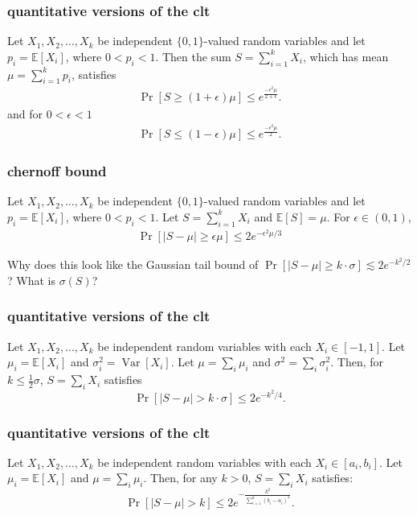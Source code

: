 \documentclass[compress]{beamer}
\newcommand{\E}{\mathbb{E}}
\DeclareMathOperator{\Var}{Var}
\begin{document}
\begin{frame}
	\frametitle{quantitative versions of the clt}
	\begin{theorem}
		Let $X_1,X_2,\ldots,X_k$ be independent $\{0,1\}$-valued random variables and let
		$p_i = \E[X_i]$, where $0<p_i<1$.
		Then the sum $S = \sum_{i=1}^{k} X_i$, which has mean
		$\mu = \sum_{i=1}^{k} p_i$, satisfies
		\begin{align*}
			\Pr[S \geq (1+\epsilon)\mu] \leq e^{\frac{-\epsilon^2\mu}{2+ \epsilon}}.
		\end{align*}
		and for $0<\epsilon <1$
		\begin{align*}
			\Pr[S \leq (1-\epsilon)\mu] \leq e^{\frac{-\epsilon^2\mu}{2}}.
		\end{align*}
	\end{theorem} 
\end{frame}

\begin{frame}[t]
	\frametitle{chernoff bound}
	\begin{theorem}
		Let $X_1,X_2,\ldots,X_k$ be independent $\{0,1\}$-valued random variables and let
		$p_i = \E[X_i]$, where $0<p_i<1$.
		Let $S = \sum_{i=1}^{k} X_i$ and $\E[S] = \mu$. For $\epsilon \in (0,1)$,
		\begin{align*}
				\Pr[|S - \mu| \geq \epsilon \mu] \leq 2e^{-\epsilon^2 \mu/3}
		\end{align*}
	\end{theorem} 
Why does this look like the Gaussian tail bound of 	$\Pr[|S - \mu| \geq k\cdot\sigma] \lesssim 2e^{-k^2/2}$? What is $\sigma(S)$?
\end{frame}



\begin{frame}[t]
	\frametitle{quantitative versions of the clt}
	\begin{theorem}
		Let $X_1, X_2, \ldots, X_k$ be independent random variables with each $X_i \in [-1,1]$.
		Let $\mu_i =\E[X_i]$ and $\sigma_i^2 = \Var[X_i]$. Let  $\mu =\sum_i \mu_i$ and $\sigma^2 =\sum_i \sigma_i^2$. Then, for $k \leq \frac{1}{2}\sigma$, $S =\sum_i X_i$ satisfies
		$$\Pr[|S - \mu| > k\cdot \sigma] \leq  2 e^{-{k^2}/{4}}.$$
	\end{theorem}
\end{frame}

\begin{frame}[t]
	\frametitle{quantitative versions of the clt}
	\begin{theorem}
		Let $X_1, X_2, \ldots, X_k$ be independent random variables with each $X_i \in [a_i,b_i]$.
		Let $\mu_i =\E[X_i]$ and $\mu =\sum_i \mu_i$. Then, for any $k > 0$, $S =\sum_i X_i$ satisfies:
		$$\Pr[|S - \mu| > k] \leq  2 e^{-\frac{k^2}{\sum_{i=1}^k (b_i-a_i)^2}}.$$
	\end{theorem}
\end{frame}
\end{document}

